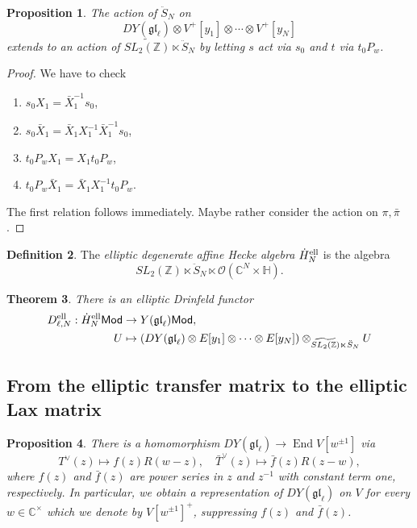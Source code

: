 \documentclass[11pt]{report}
\newtheorem{theorem}{Theorem}[section]
\newtheorem{prop}[theorem]{Proposition}
\theoremstyle{definition}
\newtheorem{definition}[theorem]{Definition}
\theoremstyle{remark}
\theoremstyle{remark}
\newcommand{\Z}{\mathbb{Z}}
\newcommand{\C}{\mathbb{C}}
\begin{document}
\begin{prop}
The action of $\ddot S_N$ on
\begin{equation*}
DY(\mathfrak{gl}_\ell) \otimes V^+[y_1] \otimes \cdots \otimes V^+[y_N]
\end{equation*}
extends to an action of $\widetilde{SL_2(\Z)} \ltimes \ddot S_N$ by letting $s$ act via $s_0$ and $t$ via $t_0 P_w$.
\end{prop}

\begin{proof}
We have to check 
\begin{enumerate}[label=(\roman*)]
\item $s_0 X_1 = \bar X_1^{-1} s_0$,
\item $s_0 \bar X_1 = \bar X_1 X_1^{-1} \bar X_1^{-1} s_0$,
\item $t_0 P_w X_1 = X_1 t_0 P_w$,
\item $t_0 P_w \bar X_1 = \bar X_1 X_1^{-1} t_0 P_w$.
\end{enumerate}
The first relation follows immediately. Maybe rather consider the action on $\pi,\bar \pi$.
\end{proof}

\begin{definition}
The \emph{elliptic degenerate affine Hecke algebra} $\dot H_N^\textnormal{ell}$ is the algebra
\begin{equation*}
SL_2(\Z) \ltimes \ddot S_N \ltimes \mathcal{O}(\C^N \times \mathbb{H}).
\end{equation*}
\end{definition}

\begin{theorem}
There is an elliptic Drinfeld functor
\begin{align*}
D_{\ell,N}^\textnormal{ell}: \dot H_N^\textnormal{ell} \mathsf{Mod} &\to Y(\mathfrak{gl}_\ell)\mathsf{Mod}, \\
U &\mapsto (DY(\mathfrak{gl}_\ell) \otimes E[y_1] \otimes \cdots \otimes E[y_N]) \otimes_{\widetilde{SL_2(\Z)} \ltimes \ddot S_N} U
\end{align*}
\end{theorem}

\subsection{From the elliptic transfer matrix to the elliptic Lax matrix}

\begin{prop}
There is a homomorphism $DY(\mathfrak{gl}_\ell) \to \operatorname{End} V[w^{\pm 1}]$ via
\begin{equation*}
T^\vee(z) \mapsto f(z) R(w-z), \quad \bar T^\vee(z) \mapsto \bar f(z) R(z-w),
\end{equation*}
where $f(z)$ and $\bar f(z)$ are power series in $z$ and $z^{-1}$ with constant term one, respectively. In particular, we obtain a representation of $DY(\mathfrak{gl}_\ell)$ on $V$ for every $w \in \C^\times$ which we denote by $V[w^{\pm 1}]^+$, suppressing $f(z)$ and $\bar f(z)$.
\end{prop}
\end{document}
